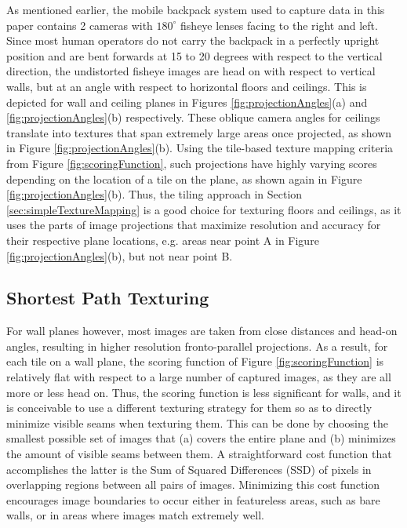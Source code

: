 \documentclass[]{spie}  %
\begin{document}
As mentioned earlier, the mobile backpack system used to capture data
in this paper contains 2 cameras with $180^\circ$ fisheye lenses
facing to the right and left. Since most human operators do not carry
the backpack in a perfectly upright position and are bent forwards at
15 to 20 degrees with respect to the vertical direction, the
undistorted fisheye images are head on with respect to vertical walls,
but at an angle with respect to horizontal floors and ceilings. This
is depicted for wall and ceiling planes in Figures
\ref{fig:projectionAngles}(a) and \ref{fig:projectionAngles}(b)
respectively. These oblique camera angles for ceilings translate into
textures that span extremely large areas once projected, as shown in
Figure \ref{fig:projectionAngles}(b). Using the tile-based texture
mapping criteria from Figure \ref{fig:scoringFunction}, such
projections have highly varying scores depending on the location of a tile on
the plane, as shown again in Figure \ref{fig:projectionAngles}(b). Thus, the
tiling approach in Section \ref{sec:simpleTextureMapping} is a
good choice for texturing floors and ceilings, as it uses the
parts of image projections that maximize resolution and accuracy for their
respective plane locations, e.g. areas near point A in Figure
\ref{fig:projectionAngles}(b), but not near point B.


\subsection{Shortest Path Texturing}

For wall planes however, most images are taken from close distances
and head-on angles, resulting in higher resolution fronto-parallel
projections. As a result, for each tile on a wall plane, the scoring
function of Figure \ref{fig:scoringFunction} is relatively flat with
respect to a large number of captured images, as they are all more or
less head on. Thus, the scoring function is less significant for
walls, and it is conceivable to use a different texturing strategy for
them so as to directly minimize visible seams when texturing
them. This can be done by choosing the smallest possible set of images
that (a) covers the entire plane and (b) minimizes the amount of
visible seams between them. A straightforward cost function that
accomplishes the latter is the Sum of Squared Differences (SSD) of
pixels in overlapping regions between all pairs of images. Minimizing
this cost function encourages image boundaries to occur either in
featureless areas, such as bare walls, or in areas where images match
extremely well.
\end{document}
